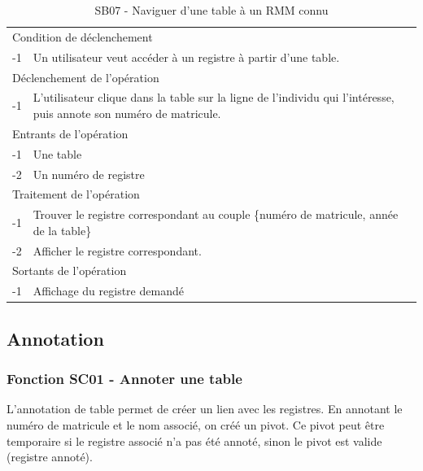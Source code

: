 \documentclass[a4paper]{article}
\begin{document}
\begin{table}[H]
  \centering
   \small
  \begin{tabular}{|c|p{12cm}|}
      \hline
        \rowcolor{lightgray}\multicolumn{2}{|c|}{\textbf{SB07 - Naviguer d'une table à un RMM connu}} \\
      \hline
        \multicolumn{2}{|l|}{Condition de d\'eclenchement} \\
      \hline
      -1 & Un utilisateur veut acc\'eder \`a un registre à partir d'une table. \\
      \hline
        \multicolumn{2}{|l|}{D\'eclenchement de l'op\'eration} \\
      \hline
        -1 & L'utilisateur clique dans la table sur la ligne de l'individu qui l'intéresse, puis annote son numéro de matricule. \\
      \hline
        \multicolumn{2}{|l|}{Entrants de l'op\'eration} \\
      \hline
        -1 & Une table \\
          -2 & Un numéro de registre \\ 
      \hline
        \multicolumn{2}{|l|}{Traitement de l'op\'eration} \\
      \hline
        -1 & Trouver le registre correspondant au couple \{numéro de matricule, année de la table\} \\
          -2 & Afficher le registre correspondant. \\
      \hline
        \multicolumn{2}{|l|}{Sortants de l'op\'eration} \\
      \hline
        -1 & Affichage du registre demand\'e \\
      \hline
  \end{tabular}
  \caption{SB07 - Naviguer d'une table à un RMM connu}
  \normalsize
  \label{tab:naviguer_table_registre_connu}
\end{table}
\newpage

\subsection{Annotation}



\subsubsection{Fonction SC01 - Annoter une table}


L'annotation de table permet de cr\'eer un lien avec les registres. En annotant le num\'ero de matricule et le nom associ\'e, on cr\'e\'e un pivot. Ce pivot peut \^etre temporaire si le registre associ\'e n'a pas \'et\'e annot\'e, sinon le pivot est valide (registre annot\'e).\\
\end{document}
